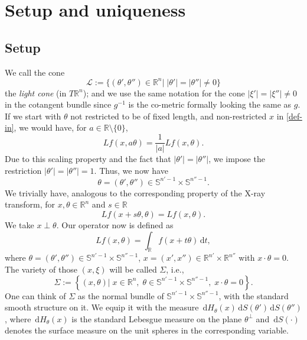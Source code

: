 \documentclass[11pt]{amsart}
\theoremstyle{definition}
\theoremstyle{remark}
\numberwithin{equation}{section}
\newcommand{\Rn}{\mathbb{R}^n}
\newcommand{\rb}{\mathbb{R}}
\renewcommand{\d}{\,\mathrm{d}}
\renewcommand{\sb}{\mathbb{S}}
\begin{document}
\section{Setup and uniqueness} 


\subsection{Setup} 
We call the cone 
\[
\mathcal{L}:= \{(\theta',\theta'')\in \rb^n|\; |\theta'|=|\theta''|\not=0\}
\]
the \textit{light cone} (in $T\rb^n$); and we use the same notation  for the cone   $|\xi'|=|\xi''|\not=0$ in the cotangent bundle since $g^{-1}$ is the co-metric formally looking the same as $g$. If we start with $\theta$ not restricted to be of fixed length, and  non-restricted $x$ in \eqref{def-in}, we would have, for $a \in \rb \setminus \{0\}$,  
\begin{equation}
Lf(x, a \theta) = \frac{1}{|a|} Lf(x, \theta).
\end{equation}
Due to this scaling property and the fact that $|\theta'| = |\theta''|$, we impose the restriction $|\theta'| = |\theta''| =1$. Thus, we now have 
\begin{equation}   \label{theta}
\theta = (\theta', \theta'') \in \sb^{n'-1} \times \sb^{n''-1}.
\end{equation}
We trivially have, analogous to the corresponding property of the X-ray transform, for $x, \theta \in \Rn$ and $s \in \rb$
\begin{equation}
Lf(x+s\theta, \theta) = Lf(x,\theta).
\end{equation}
We take $x\perp\theta$. Our operator now is defined as
\begin{equation}\label{def}
    Lf(x,\theta) = \int_{\rb} f(x+t\theta) \d t,
\end{equation}
where $\theta = (\theta',\theta'') \in \sb^{n'-1} \times \sb^{n''-1}$, $x= (x',x'') \in \rb^{n'} \times \rb^{n''}$ with $x\cdot\theta=0$. The variety of those $(x,\xi)$ will be called $\Sigma$, i.e.,  
\begin{equation}   \label{Sigma}
\Sigma := \left\{ (x,\theta)|\; x\in \Rn,\; \theta\in \sb^{n'-1}\times \sb^{n''-1},\; x\cdot\theta=0 \right\}.
\end{equation}
One can think of $\Sigma$ as the normal bundle of $\sb^{n'-1}\times \sb^{n''-1}$, with the standard smooth structure on it. We equip it with the measure $\d  H_\theta(x) \d S(\theta')\d S(\theta'')$, where $\d H_\theta(x)$ is the standard Lebesgue  measure on the plane  $\theta^\perp$  and $\d S(\cdot)$ denotes the surface measure on the unit spheres in the corresponding variable. 
\end{document}
